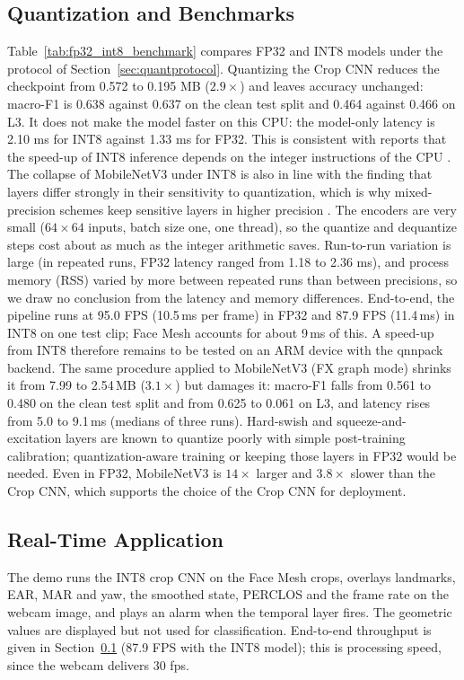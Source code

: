 \documentclass[conference]{IEEEtran}
\begin{document}
\subsection{Quantization and Benchmarks}\label{sec:quant}
Table~\ref{tab:fp32_int8_benchmark} compares FP32 and INT8 models under the protocol of Section~\ref{sec:quantprotocol}. Quantizing the Crop CNN reduces the checkpoint from 0.572 to 0.195 MB ($2.9\times$) and leaves accuracy unchanged: macro-F1 is 0.638 against 0.637 on the clean test split and 0.464 against 0.466 on L3. It does not make the model faster on this CPU: the model-only latency is 2.10 ms for INT8 against 1.33 ms for FP32. This is consistent with reports that the speed-up of INT8 inference depends on the integer instructions of the CPU \cite{shin2026}. The collapse of MobileNetV3 under INT8 is also in line with the finding that layers differ strongly in their sensitivity to quantization, which is why mixed-precision schemes keep sensitive layers in higher precision \cite{ramp2026}. The encoders are very small ($64\times64$ inputs, batch size one, one thread), so the quantize and dequantize steps cost about as much as the integer arithmetic saves. Run-to-run variation is large (in repeated runs, FP32 latency ranged from 1.18 to 2.36 ms), and process memory (RSS) varied by more between repeated runs than between precisions, so we draw no conclusion from the latency and memory differences. End-to-end, the pipeline runs at 95.0 FPS (10.5\,ms per frame) in FP32 and 87.9 FPS (11.4\,ms) in INT8 on one test clip; Face Mesh accounts for about 9\,ms of this. A speed-up from INT8 therefore remains to be tested on an ARM device with the qnnpack backend. The same procedure applied to MobileNetV3 (FX graph mode) shrinks it from 7.99 to 2.54\,MB ($3.1\times$) but damages it: macro-F1 falls from 0.561 to 0.480 on the clean test split and from 0.625 to 0.061 on L3, and latency rises from 5.0 to 9.1\,ms (medians of three runs). Hard-swish and squeeze-and-excitation layers are known to quantize poorly with simple post-training calibration; quantization-aware training or keeping those layers in FP32 would be needed. Even in FP32, MobileNetV3 is $14\times$ larger and $3.8\times$ slower than the Crop CNN, which supports the choice of the Crop CNN for deployment.

\subsection{Real-Time Application}\label{sec:realtime}
The demo runs the INT8 crop CNN on the Face Mesh crops, overlays landmarks, EAR, MAR and yaw, the smoothed state, PERCLOS and the frame rate on the webcam image, and plays an alarm when the temporal layer fires. The geometric values are displayed but not used for classification. End-to-end throughput is given in Section~\ref{sec:quant} (87.9 FPS with the INT8 model); this is processing speed, since the webcam delivers 30 fps.
\end{document}
